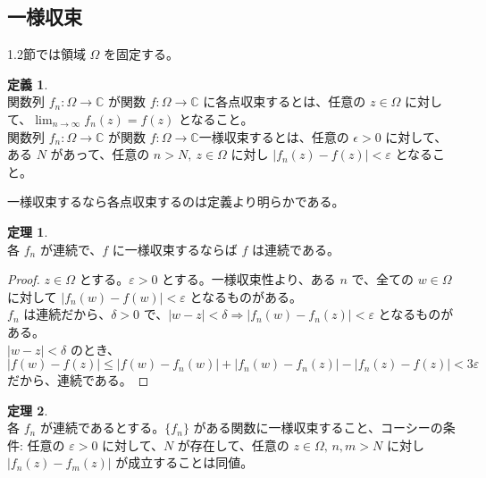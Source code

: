 \documentclass{jsarticle}
\theoremstyle{definition}
\newtheorem*{definition*}{定義}
\newtheorem{theorem}{定理}[section]
\begin{document}
    
    \subsection{一様収束}
    1.2節では領域 $\Omega$ を固定する。
    \begin{definition*} \ \\
        関数列 $f_n : \Omega \rightarrow \mathbb{C}$ が関数 $f : \Omega \rightarrow \mathbb{C}$ に各点収束するとは、任意の $z \in \Omega$ に対して、$\displaystyle \lim_{n\rightarrow\infty} f_n(z) = f(z)$ となること。\\
        関数列 $f_n : \Omega \rightarrow \mathbb{C}$ が関数 $f : \Omega \rightarrow \mathbb{C}$一様収束するとは、任意の $\epsilon > 0$ に対して、ある $N$ があって、任意の $n > N, \ z \in \Omega$ に対し $|f_n(z) - f(z)| < \varepsilon$ となること。
    \end{definition*}
    一様収束するなら各点収束するのは定義より明らかである。
    \begin{theorem} \ \\
        各 $f_n$ が連続で、$f$ に一様収束するならば $f$ は連続である。
    \end{theorem}
    \begin{proof}
        $z \in \Omega$ とする。$\varepsilon > 0$ とする。一様収束性より、ある $n$ で、全ての $w \in \Omega$ に対して $|f_n(w) - f(w)| < \varepsilon$ となるものがある。\\
        $f_n$ は連続だから、$\delta > 0$ で、$|w-z| < \delta \Rightarrow |f_n(w) - f_n(z)| < \varepsilon$ となるものがある。\\
        $|w-z| < \delta$ のとき、\\
        $|f(w) - f(z)| \leq |f(w) - f_n(w)| + |f_n(w) - f_n(z)| - |f_n(z) - f(z)| < 3\varepsilon$ だから、連続である。
    \end{proof}
    \begin{theorem} \ \\
        各 $f_n$ が連続であるとする。$\{f_n\}$ がある関数に一様収束すること、コーシーの条件: 任意の $\varepsilon > 0$ に対して、$N$ が存在して、任意の $z \in \Omega, \, n, m > N$ に対し $|f_n(z) - f_m(z)|$ が成立することは同値。
    \end{theorem}
\end{document}

